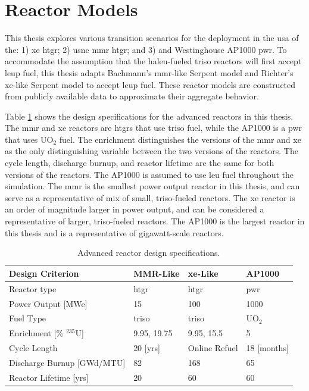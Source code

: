 \section{Reactor Models}
\label{sec:reactor_models}

This thesis explores various transition scenarios for the deployment in the \gls{usa} of the: 1) \gls{xe} \gls{htgr}; 2) \gls{usnc} \gls{mmr} \gls{htgr}; and 3) and Westinghouse AP1000 \gls{pwr}. To accommodate the assumption that the \gls{haleu}-fueled \gls{triso} reactors will first accept \gls{leup} fuel, this thesis adapts Bachmann's \gls{mmr}-like Serpent model \cite{bachmann_mmr_like_2023} and Richter's \gls{xe}-like Serpent model \cite{richter_xe100_like} to accept \gls{leup} fuel. These reactor models are constructed from publicly available data to approximate their aggregate behavior.

Table \ref{tab:ar_defs} shows the design specifications for the advanced reactors in this thesis. The \gls{mmr} and \gls{xe} reactors are \gls{htgr}s that use \gls{triso} fuel, while the AP1000 is a \gls{pwr} that uses UO$_2$ fuel. The enrichment distinguishes the versions of the \gls{mmr} and \gls{xe} as the only distinguishing variable between the two versions of the reactors. The cycle length, discharge burnup, and reactor lifetime are the same for both versions of the reactors. The AP1000 is assumed to use \gls{leu} fuel throughout the simulation. The \gls{mmr} is the smallest power output reactor in this thesis, and can serve as a representative of mix of small, \gls{triso}-fueled reactors. The \gls{xe} reactor is an order of magnitude larger in power output, and can be considered a representative of larger, \gls{triso}-fueled reactors. The AP1000 is the largest reactor in this thesis and is a representative of gigawatt-scale reactors.


\begin{table}[H]
   \centering
   \caption{Advanced reactor design specifications.}
   \label{tab:ar_defs}
   \begin{tabular}{l l l l}
      \hline
      \textbf{Design Criterion} & \textbf{MMR-Like} \cite{usnc_design_2021} & \textbf{\gls{xe}-Like} \cite{nuscale_chapter_2018} & \textbf{AP1000} \\
      \hline
      Reactor type & \gls{htgr} & \gls{htgr} & \gls{pwr} \\
      Power Output [MWe] & 15 & 100 & 1000 \\
      Fuel Type & \gls{triso} & \gls{triso} & UO$_2$ \\
      Enrichment [\% $^{235}$U] & 9.95, 19.75 & 9.95, 15.5 & 5 \\
      Cycle Length & 20 [yrs] & Online Refuel & 18 [months] \\
      Discharge Burnup [GWd/MTU] & 82 & 168 & 65 \\
      Reactor Lifetime [yrs] & 20 & 60 & 60 \\
      \hline
   \end{tabular}
\end{table}

